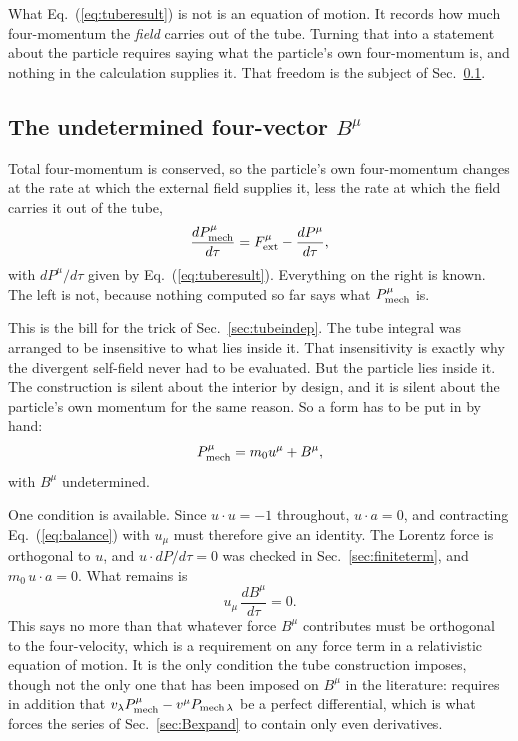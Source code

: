 \documentclass[preprint]{aastex701}
\begin{document}
What Eq.~(\ref{eq:tuberesult}) is not is an equation of motion. It records how
much four-momentum the \emph{field} carries out of the tube. Turning that into a
statement about the particle requires saying what the particle's own
four-momentum is, and nothing in the calculation supplies it. That freedom is
the subject of Sec.~\ref{sec:Bmu}.

\subsection{The undetermined four-vector $B^\mu$}
\label{sec:Bmu}

Total four-momentum is conserved, so the particle's own four-momentum changes at
the rate at which the external field supplies it, less the rate at which the
field carries it out of the tube,
\begin{equation}
\frac{dP_{\rm mech}^\mu}{d\tau} = F^\mu_{\rm ext} - \frac{dP^\mu}{d\tau},
\label{eq:balance}
\end{equation}
with $dP^\mu/d\tau$ given by Eq.~(\ref{eq:tuberesult}). Everything on the right
is known. The left is not, because nothing computed so far says what
$P_{\rm mech}^\mu$ is.

This is the bill for the trick of Sec.~\ref{sec:tubeindep}. The tube integral
was arranged to be insensitive to what lies inside it. That insensitivity is
exactly why the divergent self-field never had to be evaluated. But the
particle lies inside it. The construction is silent about the interior by
design, and it is silent about the particle's own momentum for the same reason.
So a form has to be put in by hand:
\begin{equation}
P_{\rm mech}^\mu = m_0 u^\mu + B^\mu ,
\label{eq:Pmech}
\end{equation}
with $B^\mu$ undetermined.

One condition is available. Since $u\cdot u = -1$ throughout, $u\cdot a = 0$, and
contracting Eq.~(\ref{eq:balance}) with $u_\mu$ must therefore give an identity.
The Lorentz force is orthogonal to $u$, and $u\cdot dP/d\tau = 0$ was checked in
Sec.~\ref{sec:finiteterm}, and $m_0\,u\cdot a = 0$. What remains is
\begin{equation}
u_\mu\,\frac{dB^\mu}{d\tau} = 0 .
\label{eq:Bcond}
\end{equation}
This says no more than that whatever force $B^\mu$ contributes must be
orthogonal to the four-velocity, which is a requirement on any force term in a
relativistic equation of motion. It is the only condition the tube construction
imposes, though not the only one that has been imposed on $B^\mu$ in the
literature: \citet{eliezer1947} requires in addition that
$v_\lambda P_{\rm mech}^\mu - v^\mu P_{{\rm mech}\,\lambda}$ be a perfect
differential, which is what forces the series of Sec.~\ref{sec:Bexpand} to
contain only even derivatives.
\end{document}
